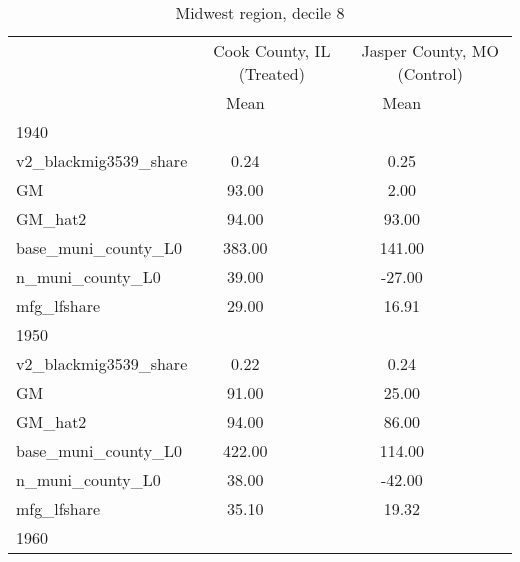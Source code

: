\begin{table}[htbp]\centering
\def\sym#1{\ifmmode^{#1}\else\(^{#1}\)\fi}
\caption{Midwest region, decile 8 \label{tab1}}
\begin{tabular}{l*{2}{ccc}}
\toprule
                    &\multicolumn{3}{c}{Cook County, IL (Treated)}&\multicolumn{3}{c}{Jasper County, MO (Control)}\\
                    &        Mean&            &            &        Mean&            &            \\
\midrule
1940                &            &            &            &            &            &            \\
v2\_blackmig3539\_share&        0.24&            &            &        0.25&            &            \\
GM                  &       93.00&            &            &        2.00&            &            \\
GM\_hat2             &       94.00&            &            &       93.00&            &            \\
base\_muni\_county\_L0 &      383.00&            &            &      141.00&            &            \\
n\_muni\_county\_L0    &       39.00&            &            &      -27.00&            &            \\
mfg\_lfshare         &       29.00&            &            &       16.91&            &            \\
\midrule
1950                &            &            &            &            &            &            \\
v2\_blackmig3539\_share&        0.22&            &            &        0.24&            &            \\
GM                  &       91.00&            &            &       25.00&            &            \\
GM\_hat2             &       94.00&            &            &       86.00&            &            \\
base\_muni\_county\_L0 &      422.00&            &            &      114.00&            &            \\
n\_muni\_county\_L0    &       38.00&            &            &      -42.00&            &            \\
mfg\_lfshare         &       35.10&            &            &       19.32&            &            \\
\midrule
1960                &            &            &            &            &            &            \\

\end{tabular}
\end{table}
